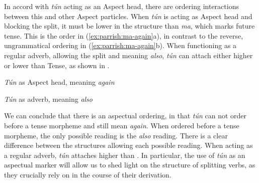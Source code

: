 \documentclass[output=paper]{LSP/langsci}
\begin{document}
 
In accord with \textit{t\'{u}n} acting as an Aspect head, there are ordering interactions between this and other Aspect particles. When \textit{t\'{u}n} is acting as Aspect head and blocking the split, it must be lower in the structure than \textit{ma}, which marks future tense. This is the order in (\ref{ex:parrish:ma-again}a), in contrast to the reverse, ungrammatical ordering in (\ref{ex:parrish:ma-again}b). When functioning as a regular adverb, allowing the split and meaning \textit{also}, \textit{t\'{u}n} can attach either higher or lower than Tense, as shown in . 
   

\ea  \label{ex:parrish:ma-again}  \textit{T\'{u}n} as Aspect head, meaning \textit{again}
    
 \z

\z



\ea \textit{T\'{u}n} as adverb, meaning \textit{also}
    
 \z
 \label{ex:parrish:ma-also} 
\z


We can conclude that there is an aspectual ordering, in that \textit{t\'{u}n} can not order before a tense morpheme and still mean \textit{again}. When ordered before a tense morpheme, the only possible reading is the \textit{also} reading. There is a clear difference between the structures allowing each possible reading. When acting as a regular adverb, \textit{t\'{u}n} attaches higher than . In particular, the use of \textit{t\'{u}n} as an aspectual marker will allow us to shed light on the structure of splitting verbs, as they crucially rely on  in the course of their derivation.
\end{document}
